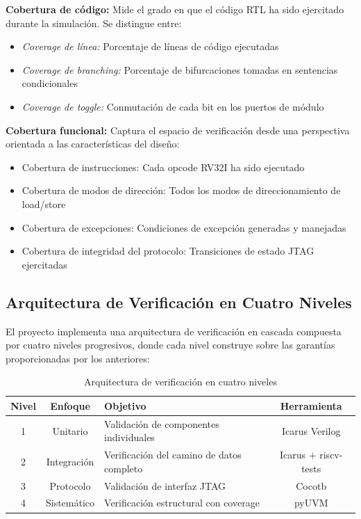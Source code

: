 \textbf{Cobertura de código:} Mide el grado en que el código RTL ha sido ejercitado durante la simulación. Se distingue entre:
\begin{itemize}
    \item \textit{Coverage de línea:} Porcentaje de líneas de código ejecutadas
    \item \textit{Coverage de branching:} Porcentaje de bifurcaciones tomadas en sentencias condicionales
    \item \textit{Coverage de toggle:} Conmutación de cada bit en los puertos de módulo
\end{itemize}

\textbf{Cobertura funcional:} Captura el espacio de verificación desde una perspectiva orientada a las características del diseño:
\begin{itemize}
    \item Cobertura de instrucciones: Cada opcode RV32I ha sido ejecutado
    \item Cobertura de modos de dirección: Todos los modos de direccionamiento de load/store
    \item Cobertura de excepciones: Condiciones de excepción generadas y manejadas
    \item Cobertura de integridad del protocolo: Transiciones de estado JTAG ejercitadas
\end{itemize}

\subsection{Arquitectura de Verificación en Cuatro Niveles}
\label{sec:FourLevelArch}

El proyecto implementa una arquitectura de verificación en cascada compuesta por cuatro niveles progresivos, donde cada nivel construye sobre las garantías proporcionadas por los anteriores:

\begin{table}[H]
\centering
\begin{tabular}{|c|c|l|c|}
\hline
\textbf{Nivel} & \textbf{Enfoque} & \textbf{Objetivo} & \textbf{Herramienta} \\
\hline
1 & Unitario & Validación de componentes individuales & Icarus Verilog \\
\hline
2 & Integración & Verificación del camino de datos completo & Icarus + riscv-tests \\
\hline
3 & Protocolo & Validación de interfaz JTAG & Cocotb \\
\hline
4 & Sistemático & Verificación estructural con coverage & pyUVM \\
\hline
\end{tabular}
\caption{Arquitectura de verificación en cuatro niveles}
\label{tab:VerifArch}
\end{table}

